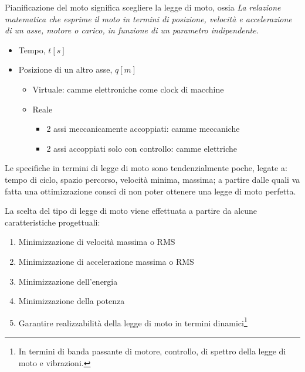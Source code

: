 Pianificazione del moto significa scegliere la legge di moto, ossia \textit{La relazione matematica che esprime il moto in termini di posizione, velocità e accelerazione di un asse, motore o carico, in funzione di un parametro indipendente.}
\begin{itemize}
    \item Tempo, \(t [s]\)
    \item Posizione di un altro asse, \(q [m]\)
    \begin{itemize}
        \item Virtuale: camme elettroniche come clock di macchine
        \item Reale
        \begin{itemize}
            \item 2 assi meccanicamente accoppiati: camme meccaniche
            \item 2 assi accoppiati solo con controllo: camme elettriche
        \end{itemize}
    \end{itemize}
\end{itemize}

Le specifiche in termini di legge di moto sono tendenzialmente poche, legate a: tempo di ciclo, spazio percorso, velocità minima, massima; a partire dalle quali va fatta una ottimizzazione consci di non poter ottenere una legge di moto perfetta.

La scelta del tipo di legge di moto viene effettuata a partire da alcune caratteristiche progettuali:
\begin{enumerate}
    \item Minimizzazione di velocità massima o RMS
    \item Minimizzazione di accelerazione massima o RMS
    \item Minimizzazione dell'energia
    \item Minimizzazione della potenza
    \item Garantire realizzabilità della legge di moto in termini dinamici\footnote{In termini di banda passante di motore, controllo, di spettro della legge di moto e vibrazioni.}
\end{enumerate}
